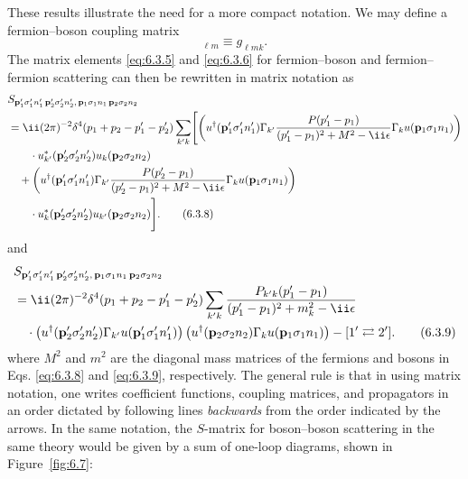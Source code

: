These results illustrate the need for a more compact notation. We may define a
fermion--boson coupling matrix
\begin{equation}
[\Gamma_k]_{\ell m}\equiv g_{\ell mk}.
\tag{6.3.7}
\label{eq:6.3.7}
\end{equation}
The matrix elements \eqref{eq:6.3.5} and \eqref{eq:6.3.6} for fermion--boson and
fermion--fermion scattering can then be rewritten in matrix notation as
\begin{align}
&S_{\mathbf p'_1\sigma'_1n'_1\,\mathbf p'_2\sigma'_2n'_2,\,
\mathbf p_1\sigma_1n_1\,\mathbf p_2\sigma_2n_2}\notag\\
&=\ii(2\pi)^{-2}\delta^4(p_1+p_2-p'_1-p'_2)\sum_{k'k}
\Biggl[\left(u^\dagger(\mathbf p'_1\sigma'_1n'_1)\Gamma_{k'}
\frac{P(p'_1-p_1)}{(p'_1-p_1)^2+M^2-\ii\epsilon}
\Gamma_k u(\mathbf p_1\sigma_1n_1)\right)\notag\\
&\qquad\cdot u_{k'}^*(\mathbf p'_2\sigma'_2n'_2)
u_k(\mathbf p_2\sigma_2n_2)\notag\\
&\quad{}+\left(u^\dagger(\mathbf p'_1\sigma'_1n'_1)\Gamma_{k'}
\frac{P(p'_2-p_1)}{(p'_2-p_1)^2+M^2-\ii\epsilon}
\Gamma_k u(\mathbf p_1\sigma_1n_1)\right)\notag\\
&\qquad\cdot u_k^*(\mathbf p'_2\sigma'_2n'_2)
u_{k'}(\mathbf p_2\sigma_2n_2)\Biggr].
\tag{6.3.8}
\label{eq:6.3.8}
\end{align}
and
\begin{align}
&S_{\mathbf p'_1\sigma'_1n'_1\,\mathbf p'_2\sigma'_2n'_2,\,
\mathbf p_1\sigma_1n_1\,\mathbf p_2\sigma_2n_2}\notag\\
&=\ii(2\pi)^{-2}\delta^4(p_1+p_2-p'_1-p'_2)
\sum_{k'k}\frac{P_{k'k}(p'_1-p_1)}{(p'_1-p_1)^2+m_k^2-\ii\epsilon}\notag\\
&\quad\cdot
\left(u^\dagger(\mathbf p'_2\sigma'_2n'_2)\Gamma_{k'}
u(\mathbf p'_1\sigma'_1n'_1)\right)
\left(u^\dagger(\mathbf p_2\sigma_2n_2)\Gamma_k
u(\mathbf p_1\sigma_1n_1)\right)-[1'\rightleftarrows2'].
\tag{6.3.9}
\label{eq:6.3.9}
\end{align}
where $M^2$ and $m^2$ are the diagonal mass matrices of the fermions and bosons
in Eqs. \eqref{eq:6.3.8} and \eqref{eq:6.3.9}, respectively. The general rule is that in using
matrix notation, one writes coefficient functions, coupling matrices, and
propagators in an order dictated by following lines \textit{backwards} from the
order indicated by the arrows. In the same notation, the $S$-matrix for
boson--boson scattering in the same theory would be given by a sum of one-loop
diagrams, shown in Figure~\ref{fig:6.7}:
